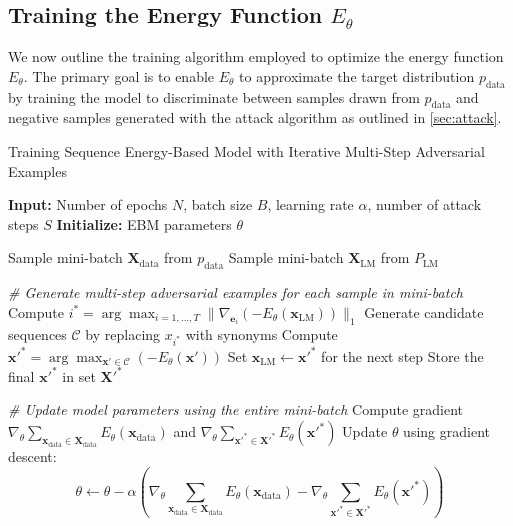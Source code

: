 \documentclass[11pt]{article}
\begin{document}
\subsection{Training the Energy Function \(E_\theta\)}

We now outline the training algorithm employed to optimize the energy function \(E_\theta\). The primary goal is to enable \(E_\theta\) to approximate the target distribution \( p_{\text{data}}\) by training the model to discriminate between samples drawn from \( p_{\text{data}} \) and negative samples generated with the attack algorithm as outlined in \cref{sec:attack}.

  \begin{algorithm}
    \caption{Training Sequence Energy-Based Model with Iterative Multi-Step Adversarial Examples}
    \label{alg:training-ebm}
    \begin{algorithmic}[1]
    \STATE \textbf{Input:} Number of epochs \( N \), batch size \( B \), learning rate \( \alpha \), number of attack steps \( S \)
    \STATE \textbf{Initialize:} EBM parameters \( \theta \)
    
        \STATE Sample mini-batch \( \mathbf{X}_{\text{data}} \) from \( p_{\text{data}} \)
        \STATE Sample mini-batch \( \mathbf{X}_{\text{LM}} \) from \( P_{\text{LM}} \)
            
        \STATE \textit{\# Generate multi-step adversarial examples for each sample in mini-batch}
                \STATE Compute \( i^* = \arg\max_{i=1,...,T} \|\nabla_{\mathbf{e}_i} (-E_\theta(\mathbf{x}_{\text{LM}}))\|_1 \)
                \STATE Generate candidate sequences \( \mathcal{C} \) by replacing \( x_{i^*} \) with synonyms
                \STATE Compute \( \mathbf{x'}^* = \arg\max_{\mathbf{x'} \in \mathcal{C}} (-E_\theta(\mathbf{x'})) \)
                \STATE Set \( \mathbf{x}_{\text{LM}} \leftarrow \mathbf{x'}^* \) for the next step
            \ENDFOR
            \STATE Store the final \( \mathbf{x'}^* \) in set \( \mathbf{X'}^* \)
        \ENDFOR
            
        \STATE \textit{\# Update model parameters using the entire mini-batch}
        \STATE Compute gradient \( \nabla_\theta \sum_{\mathbf{x}_{\text{data}} \in \mathbf{X}_{\text{data}}} E_\theta(\mathbf{x}_{\text{data}}) \) and \( \nabla_\theta \sum_{\mathbf{x'}^* \in \mathbf{X'}^*} E_\theta(\mathbf{x'}^*) \)
        \STATE Update \( \theta \) using gradient descent:
        \[
        \theta \leftarrow \theta - \alpha \left( \nabla_\theta \sum_{\mathbf{x}_{\text{data}} \in \mathbf{X}_{\text{data}}} E_\theta(\mathbf{x}_{\text{data}}) - \nabla_\theta \sum_{\mathbf{x'}^* \in \mathbf{X'}^*} E_\theta(\mathbf{x'}^*) \right)
        \]
    \ENDFOR
    \end{algorithmic}
  \end{algorithm}
  
\end{document}
